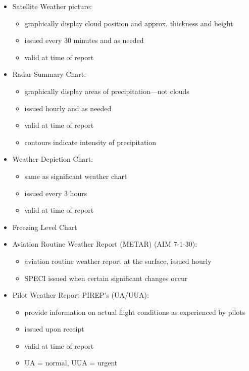 \begin{itemize}
  \item Satellite Weather picture:
    \begin{itemize}
      \item graphically display cloud position and approx. thickness and height
      \item issued every 30 minutes and as needed
      \item valid at time of report
    \end{itemize}
  \item Radar Summary Chart:
    \begin{itemize}
      \item graphically display areas of precipitation—not clouds
      \item issued hourly and as needed
      \item valid at time of report
      \item contours indicate intensity of precipitation
    \end{itemize}
  \item Weather Depiction Chart:
    \begin{itemize}
      \item same as significant weather chart
      \item issued every 3 hours
      \item valid at time of report
    \end{itemize}
  \item Freezing Level Chart
  \item Aviation Routine Weather Report (METAR) (AIM 7-1-30):
    \begin{itemize}
      \item aviation routine weather report at the surface, issued hourly
      \item SPECI issued when certain significant changes occur
    \end{itemize}
  \item Pilot Weather Report PIREP's (UA/UUA):
    \begin{itemize}
      \item provide information on actual flight conditions as experienced by
        pilots
      \item issued upon receipt
      \item valid at time of report
      \item UA = normal, UUA = urgent
    \end{itemize}
\end{itemize}


